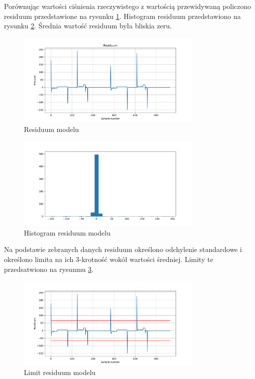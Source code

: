 \documentclass[a4paper,12pt]{article}
\begin{document}
Porównując wartości ciśnienia rzeczywistego z wartością przewidywaną policzono residuum przedstawione na rysunku \ref{fig:model_residuum}. Histogram residuum przedstawiono na rysunku \ref{fig:model_residuum_hist}. Średnia wartość residuum była bliskia zeru. 
\begin{figure}[H]
        \centering
        \includegraphics[width=0.8\textwidth]{model_residuum.pdf}
        \caption{Residuum modelu}
        \label{fig:model_residuum}
\end{figure}
\begin{figure}[H]
        \centering
        \includegraphics[width=0.8\textwidth]{model_residuum_hist.pdf}
        \caption{Histogram residuum modelu}
        \label{fig:model_residuum_hist}
\end{figure}

Na podstawie zebranych danych residuum określono odchylenie standardowe i określono limita na ich 3-krotność wokół wartości średniej. Limity te przedsatwiono na rysunmu \ref{fig:model_residuum_limit}.

\begin{figure}[H]
        \centering
        \includegraphics[width=0.8\textwidth]{model_residuum_limits.pdf}
        \caption{Limit residuum modelu}
        \label{fig:model_residuum_limit}
\end{figure}
\end{document}
